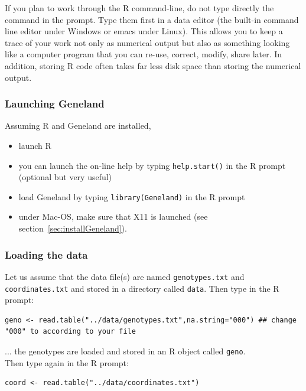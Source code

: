 \documentclass{article}
\begin{document}
If you plan to work through the R command-line, do not type directly the command in the prompt. 
Type them first in a data editor (the built-in command line editor under Windows or emacs under Linux). 
This allows you to keep a trace of your work not only as numerical output but also as something looking like 
a computer program that you can 
re-use, correct, modify, share later. In addition, storing R code often takes far less disk space than storing 
the numerical output.

\subsubsection{Launching {\sc Geneland}}
Assuming R and {\sc Geneland} are installed, 
\begin{itemize}
\item launch R
\item you can launch the on-line help by typing {\tt help.start()} in the R prompt (optional but very useful)
\item load {\sc Geneland} by typing {\tt library(Geneland)} in the R prompt
\item under Mac-OS, make sure that   X11 is launched (see section~\ref{sec:installGeneland}).
\end{itemize}

\subsubsection{Loading the data}


Let us assume that the data file(s) are named \texttt{genotypes.txt} and \texttt{coordinates.txt} 
and stored in a directory called \texttt{data}.
Then type in the R prompt:

\begin{verbatim}
geno <- read.table("../data/genotypes.txt",na.string="000") ## change "000" to according to your file
\end{verbatim}



... the genotypes are loaded and stored in an R object called \texttt{geno}.\\


Then type again in the R prompt:

\begin{verbatim}
coord <- read.table("../data/coordinates.txt")
\end{verbatim}
\end{document}
